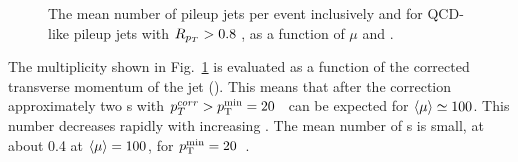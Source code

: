 \begin{figure}[htbp!]\centering
{}
    \caption[]{The mean number of pileup jets per event inclusively  and for QCD-like pileup jets with $R_{p_T} > 0.8$
    , as a function of $\mu$ and \ptcorr. }
    \label{fig:pujetmult}
\end{figure}

The \pujet{} multiplicity shown in Fig.~\ref{fig:pujetmult} is evaluated as a function of the \pu{} corrected transverse momentum of the jet (\ptcorr). This means that after the correction approximately two \pujet{}s with $p_T^{corr} > p_{\mathrm{T}}^{\mathrm{min}} = 20$~\GeV{} can be expected for $\langle\mu\rangle \simeq 100$. This number decreases rapidly with increasing \pTmin. The mean number of \qcdjet s is small, at about 0.4 at $\langle\mu\rangle = 100$, for $p_{\mathrm{T}}^{\mathrm{min}} = 20$~\GeV.



%
%















